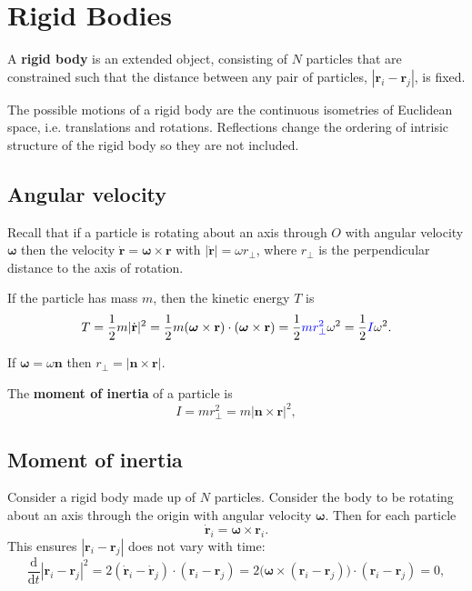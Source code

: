 \section{Rigid Bodies}

\begin{definition}
    A \textbf{rigid body} is an extended object, consisting of $N$ particles that are constrained such that the distance between any pair of particles, $|\mathbf{r}_i - \mathbf{r}_j|$, is fixed. 
\end{definition}

The possible motions of a rigid body are the continuous isometries of Euclidean space, i.e. translations and rotations. Reflections change the ordering of intrisic structure of the rigid body so they are not included.

\subsection{Angular velocity}

Recall that if a particle is rotating about an axis through $O$ with angular velocity $ \boldsymbol{\omega} $ then the velocity $ \dot{\mathbf{r}} = \boldsymbol{\omega}\times \mathbf{r} $ with $ |\dot{\mathbf{r}}|=\omega r_\perp  $, where $ r_\perp  $ is the perpendicular distance to the axis of rotation.

If the particle has mass $m$, then the kinetic energy $T$ is 
\[
    T = \frac{1}{2}m|\dot{\mathbf{r}}|^2 = \frac{1}{2}m (\boldsymbol{\omega}\times \mathbf{r})\cdot (\boldsymbol{\omega}\times \mathbf{r}) = \frac{1}{2}{\color{blue}mr_\perp^2} \omega^2 = \frac{1}{2}{\color{blue}I} \omega^2 .
\]
\begin{note}
    If $ \boldsymbol{\omega}=\omega \mathbf{n} $ then $ r_\perp = |\mathbf{n}\times \mathbf{r}| $.
\end{note}

\begin{definition}
    The \textbf{moment of inertia} of a particle is
    \[
      I = m r_\perp^2 = m|\mathbf{n}\times \mathbf{r}|^2,
    \]
\end{definition}

\subsection{Moment of inertia}

Consider a rigid body made up of $N$ particles. Consider the body to be rotating about an axis through the origin with angular velocity $ \boldsymbol{\omega} $. Then for each particle 
\[
    \dot{\mathbf{r}}_i = \boldsymbol\omega\times \mathbf{r}_i.
\]
This ensures $ |\mathbf{r}_i-\mathbf{r}_j| $ does not vary with time:
\[
  \frac{\mathrm{d} }{\mathrm{d} t}|\mathbf{r}_i - \mathbf{r}_j|^2 = 2(\dot{\mathbf{r}}_i - \dot{\mathbf{r}}_j)\cdot (\mathbf{r}_i - \mathbf{r}_j) = 2\big(\boldsymbol\omega\times (\mathbf{r}_i - \mathbf{r}_j)\big) \cdot (\mathbf{r}_i - \mathbf{r}_j) = 0,
\]

